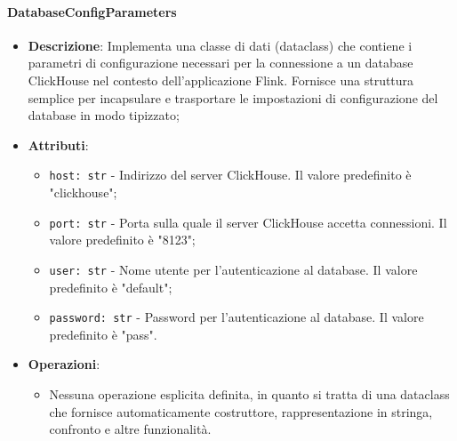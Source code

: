 \documentclass[10pt]{article}
\begin{document}
    \paragraph{DatabaseConfigParameters}
    \begin{itemize} 
    \item \textbf{Descrizione}: Implementa una classe di dati (dataclass) che contiene i parametri di configurazione necessari per la connessione a un database ClickHouse nel contesto dell'applicazione Flink. Fornisce una struttura semplice per incapsulare e trasportare le impostazioni di configurazione del database in modo tipizzato;
    \item \textbf{Attributi}:
    \begin{itemize}
        \item \texttt{host: str} - Indirizzo del server ClickHouse. Il valore predefinito è "clickhouse";
        \item \texttt{port: str} - Porta sulla quale il server ClickHouse accetta connessioni. Il valore predefinito è "8123";
        \item \texttt{user: str} - Nome utente per l'autenticazione al database. Il valore predefinito è "default";
        \item \texttt{password: str} - Password per l'autenticazione al database. Il valore predefinito è "pass".
    \end{itemize}
    
    \item \textbf{Operazioni}:
    \begin{itemize}
        \item Nessuna operazione esplicita definita, in quanto si tratta di una dataclass che fornisce automaticamente costruttore, rappresentazione in stringa, confronto e altre funzionalità.
    \end{itemize}
    \end{itemize}
\end{document}
